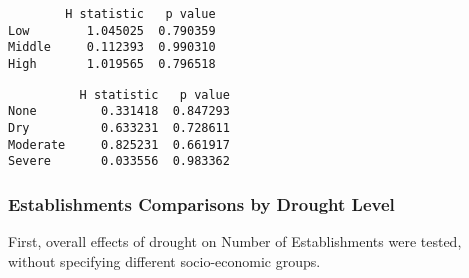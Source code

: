 \documentclass[11pt]{article}
\begin{document}
    
    \begin{verbatim}
        H statistic   p value
Low        1.045025  0.790359
Middle     0.112393  0.990310
High       1.019565  0.796518
    \end{verbatim}

    
    
    \begin{verbatim}
          H statistic   p value
None         0.331418  0.847293
Dry          0.633231  0.728611
Moderate     0.825231  0.661917
Severe       0.033556  0.983362
    \end{verbatim}

    
    \hypertarget{establishments-comparisons-by-drought-level}{%
\subsubsection{Establishments Comparisons by Drought
Level}\label{establishments-comparisons-by-drought-level}}

    First, overall effects of drought on Number of Establishments were
tested, without specifying different socio-economic groups.
\end{document}
